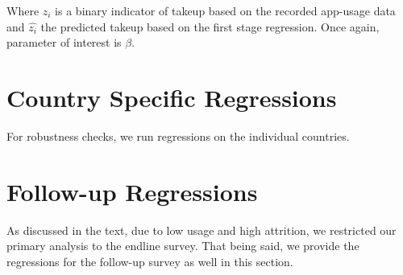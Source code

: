 \documentclass{article}
\begin{document}
Where $z_i$ is a binary indicator of takeup based on the recorded app-usage data and $\hat{z_i}$ the predicted takeup based on the first stage regression. Once again, parameter of interest is $\beta$.








\section{Country Specific Regressions}

For robustness checks, we run regressions on the individual countries.









% 
% 
% 

% 
% 
% 

\section{Follow-up Regressions}

As discussed in the text, due to low usage and high attrition, we restricted our primary analysis to the endline survey. That being said, we provide the regressions for the follow-up survey as well in this section.




\end{document}
